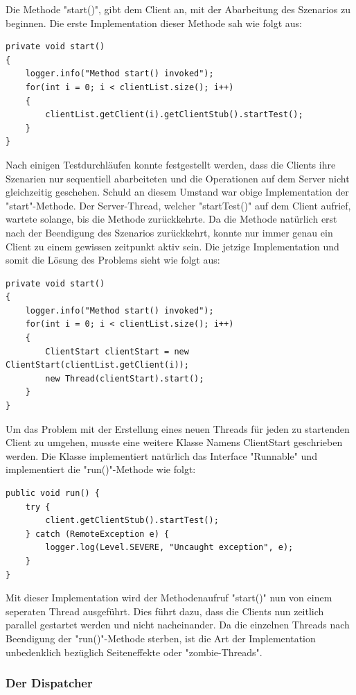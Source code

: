 Die Methode "start()", gibt dem Client an, mit der Abarbeitung des Szenarios zu beginnen. Die erste Implementation dieser Methode sah wie folgt aus:
\begin{lstlisting}
private void start()
{
	logger.info("Method start() invoked");
	for(int i = 0; i < clientList.size(); i++)
	{
		clientList.getClient(i).getClientStub().startTest();
	}
}
\end{lstlisting}

Nach einigen Testdurchläufen konnte festgestellt werden, dass die Clients ihre Szenarien nur sequentiell abarbeiteten und die Operationen auf dem Server nicht gleichzeitig geschehen. Schuld an diesem Umstand war obige Implementation der "start"-Methode. Der Server-Thread, welcher "startTest()" auf dem Client aufrief, wartete solange, bis die Methode zurückkehrte. Da die Methode natürlich erst nach der Beendigung des Szenarios zurückkehrt, konnte nur immer genau ein Client zu einem gewissen zeitpunkt aktiv sein.\newline
Die jetzige Implementation und somit die Lösung des Problems sieht wie folgt aus:
\begin{lstlisting}
private void start()
{
	logger.info("Method start() invoked");
	for(int i = 0; i < clientList.size(); i++)
	{
		ClientStart clientStart = new ClientStart(clientList.getClient(i));
		new Thread(clientStart).start();
	}
}
\end{lstlisting}
Um das Problem mit der Erstellung eines neuen Threads für jeden zu startenden Client zu umgehen, musste eine weitere Klasse Namens ClientStart geschrieben werden. Die Klasse implementiert natürlich das Interface "Runnable" und implementiert die "run()"-Methode wie folgt:
\begin{lstlisting}
public void run() {
	try {
		client.getClientStub().startTest();
	} catch (RemoteException e) {
		logger.log(Level.SEVERE, "Uncaught exception", e);
	}
}
\end{lstlisting}

Mit dieser Implementation wird der Methodenaufruf "start()" nun von einem seperaten Thread ausgeführt. Dies führt dazu, dass die Clients nun zeitlich parallel gestartet werden und nicht nacheinander. Da die einzelnen Threads nach Beendigung der "run()"-Methode sterben, ist die Art der Implementation unbedenklich bezüglich Seiteneffekte oder "zombie-Threads".

\subsubsection{Der Dispatcher}
\label{sec:dispatcher}


